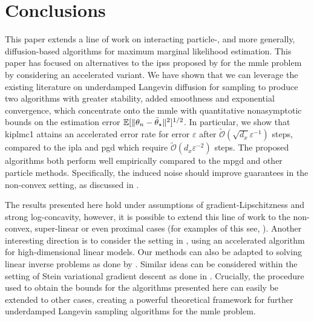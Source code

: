 \section{Conclusions}
This paper extends a line of work on interacting particle-, and more generally, diffusion-based algorithms for maximum marginal likelihood estimation. This paper has focused on alternatives to the \glspl*{ips} proposed by \citep{kuntz2023particle, akyildiz2025interacting, lim2023momentum} for the \gls*{mmle} problem by considering an accelerated variant. We have shown that we can leverage the existing literature on underdamped Langevin diffusion for sampling \citep{dalalyan2018sampling, cheng2018underdamped, monmarche2021high, Nesterovacc} to produce two algorithms with greater stability, added smoothness and exponential convergence, which concentrate onto the \gls*{mmle} with quantitative nonasymptotic bounds on the estimation error ${\mathbb E}[\|\theta_n - \bar{\theta}_\star\|^2]^{1/2}$. In particular, we show that \gls*{kiplmc1} attains an accelerated error rate for error $\varepsilon$ after $\widetilde{\mathcal{O}}(\sqrt{d_x} \varepsilon^{-1})$ steps, compared to the \gls*{ipla} and \gls*{pgd} which require $\widetilde{\mathcal{O}}(d_x \varepsilon^{-2})$ steps. The proposed algorithms both perform well empirically compared to the \gls*{mpgd} and other particle methods. Specifically, the induced noise should improve guarantees in the non-convex setting, as discussed in \citep{akyildiz2025interacting, raginsky2017non,akyildiz2024nonasymptotic}. 

The results presented here hold under assumptions of gradient-Lipschitzness and strong log-concavity, however, it is possible to extend this line of work to the non-convex, super-linear or even proximal cases (for examples of this see, \citep{zhang2023nonasymptotic,akyildiz2024nonasymptotic,johnston2023kinetic, encinar2025proximal}). Another interesting direction is to consider the setting in \citep{fan2023gradient}, using an accelerated algorithm for high-dimensional linear models. Our methods can also be adapted to solving linear inverse problems as done by \citep{akyildiz2022statistical,glyn2024statistical}. Similar ideas can be considered within the setting of Stein variational gradient descent as done in \citep{sharrock2024tuning}. Crucially, the procedure used to obtain the bounds for the algorithms presented here can easily be extended to other cases, creating a powerful theoretical framework for further underdamped Langevin sampling algorithms for the \gls*{mmle} problem.

